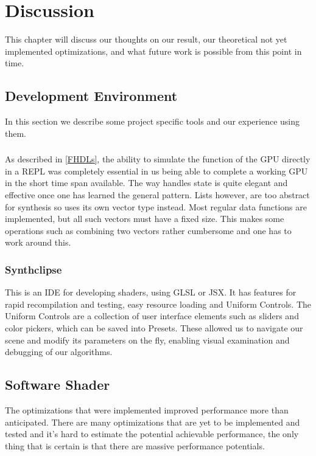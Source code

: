 \chapter{Discussion} 

	This chapter will discuss our thoughts on our result, our theoretical not
	yet	implemented optimizations, and what future work is possible from this
	point in time.
	
	\section{Development Environment}
		
		In this section we describe some project specific tools and our experience using them.
		
		\subsection{\clash}
			As described in \ref{FHDLs}, the ability to simulate the function of
			the GPU directly in a REPL was completely essential in us being able
			to complete a working GPU in the short time span available. The way
			\clash{} handles state is quite elegant and effective once one has
			learned the general pattern. Lists however, are too abstract for
			synthesis so \clash{}  uses its own vector type instead. Most 
			regular
			data functions are implemented, but all such vectors must have a
			fixed size. This makes some operations such as combining two vectors
			rather cumbersome and one has to work around this.
	
		\subsection{Synthclipse}
			This is an IDE for developing shaders, using GLSL or JSX. It has
			features for rapid recompilation and testing, easy resource loading 
			and	Uniform Controls. The Uniform Controls are a collection of user
			interface elements such as sliders and color pickers, which can be
			saved into Presets. These allowed us to navigate our scene and 
			modify its parameters on the fly, enabling visual examination and 
			debugging of our algorithms.		
		
		\section{Software Shader}

			The optimizations that were implemented improved performance more
			than anticipated. There are many optimizations that are yet to be
			implemented and tested and it's hard to estimate the potential
			achievable performance, the only thing that is certain is that
			there are massive performance potentials.
			
